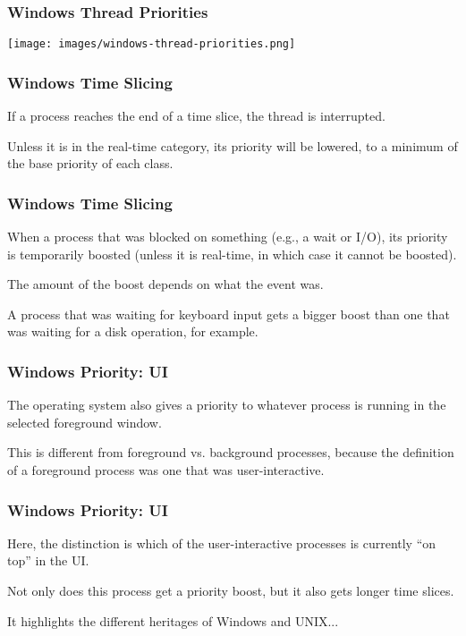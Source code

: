 \begin{frame}
\frametitle{Windows Thread Priorities}

\begin{center}
	\texttt{[image: images/windows-thread-priorities.png]}
\end{center}

\end{frame}

\begin{frame}
\frametitle{Windows Time Slicing}

If a process reaches the end of a time slice, the thread is interrupted.

Unless it is in the real-time category, its priority will be lowered, to a minimum of the base priority of each class. 

\end{frame}

\begin{frame}
\frametitle{Windows Time Slicing}

When a process that was blocked on something (e.g., a wait or I/O), its priority is temporarily boosted (unless it is real-time, in which case it cannot be boosted). 

The amount of the boost depends on what the event was.

A process that was waiting for keyboard input gets a bigger boost than one that was waiting for a disk operation, for example.

\end{frame}

\begin{frame}
\frametitle{Windows Priority: UI}

The operating system also gives a priority to whatever process is running in the selected foreground window. 

This is different from foreground vs. background processes, because the definition of a foreground process was one that was user-interactive. 

\end{frame}

\begin{frame}
\frametitle{Windows Priority: UI}

Here, the distinction is which of the user-interactive processes is currently ``on top'' in the UI. 

Not only does this process get a priority boost, but it also gets longer time slices. 

It highlights the different heritages of Windows and UNIX...

\end{frame}





